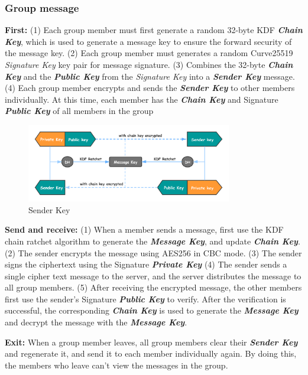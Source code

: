 \documentclass[11pt]{article}
\begin{document}
\subsubsection{Group message}
\textbf{First: } (1) Each group member must first generate a random 32-byte KDF \textbf{\emph{Chain Key}}, which is used to generate a message key to ensure the forward security of the message key.
(2) Each group member must generates a random Curve25519 \emph{Signature Key} key pair for message signature. 
(3) Combines the 32-byte \textbf{\emph{Chain Key}} and the \textbf{\emph{Public Key}} from the \emph{Signature Key} into a \textbf{\emph{Sender Key}} message.
(4) Each group member encrypts and sends the \textbf{\emph{Sender Key}} to other members individually. 
At this time, each member has the \textbf{\emph{Chain Key}} and Signature \textbf{\emph{Public Key}} of all members in the group

\begin{figure}[H]
    \centering
    \includegraphics[width=0.8\textwidth]{Fig6}
    \caption{Sender Key}
\end{figure}
\textbf{Send and receive: } (1) When a member sends a message, first use the KDF chain ratchet algorithm to generate the \textbf{\emph{Message Key}}, and update \textbf{\emph{Chain Key}}.
(2) The sender encrypts the message using AES256 in CBC mode.
(3) The sender signs the ciphertext using the Signature \textbf{\emph{Private Key}}
(4) The sender sends a single cipher text message to the server, and the server distributes the message to all group members.
(5) After receiving the encrypted message, the other members first use the sender's Signature \textbf{\emph{Public Key}} to verify. After the verification is successful, the corresponding \textbf{\emph{Chain Key}} is used to generate the \textbf{\emph{Message Key}} and decrypt the message with the \textbf{\emph{Message Key}}.

\textbf{Exit: } When a group member leaves, all group members clear their \textbf{\emph{Sender Key}} and regenerate it, and send it to each member individually again. 
By doing this, the members who leave can't view the messages in the group.
\end{document}
